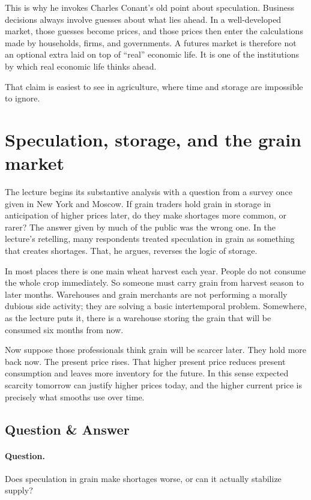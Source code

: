 This is why he invokes Charles Conant's old point about speculation. Business decisions always involve guesses about what lies ahead. In a well-developed market, those guesses become prices, and those prices then enter the calculations made by households, firms, and governments. A futures market is therefore not an optional extra laid on top of ``real'' economic life. It is one of the institutions by which real economic life thinks ahead.

That claim is easiest to see in agriculture, where time and storage are impossible to ignore.

\section{Speculation, storage, and the grain market}

The lecture begins its substantive analysis with a question from a survey once given in New York and Moscow. If grain traders hold grain in storage in anticipation of higher prices later, do they make shortages more common, or rarer? The answer given by much of the public was the wrong one. In the lecture's retelling, many respondents treated speculation in grain as something that creates shortages. That, he argues, reverses the logic of storage.

In most places there is one main wheat harvest each year. People do not consume the whole crop immediately. So someone must carry grain from harvest season to later months. Warehouses and grain merchants are not performing a morally dubious side activity; they are solving a basic intertemporal problem. Somewhere, as the lecture puts it, there is a warehouse storing the grain that will be consumed six months from now.

Now suppose those professionals think grain will be scarcer later. They hold more back now. The present price rises. That higher present price reduces present consumption and leaves more inventory for the future. In this sense expected scarcity tomorrow can justify higher prices today, and the higher current price is precisely what smooths use over time.

\subsection{Question \& Answer}

\paragraph{Question.} Does speculation in grain make shortages worse, or can it actually stabilize supply?

